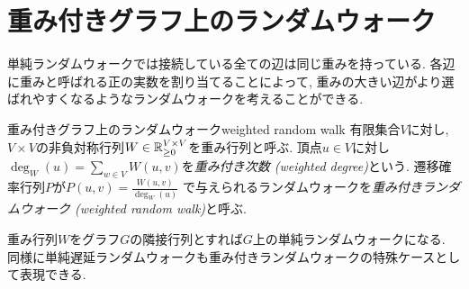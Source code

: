 \section{重み付きグラフ上のランダムウォーク}
単純ランダムウォークでは接続している全ての辺は同じ重みを持っている.
各辺に重みと呼ばれる正の実数を割り当てることによって,
重みの大きい辺がより選ばれやすくなるようなランダムウォークを考えることができる.
%
\begin{definition}{重み付きグラフ上のランダムウォーク}{weighted random walk}
  有限集合$V$に対し, $V\times V$の非負対称行列$W\in \mathbb{R}_{\ge 0}^{V\times V}$を重み行列と呼ぶ.
  頂点$u \in V$に対し$\deg_W(u) = \sum_{w \in V} W(u,v)$を\emph{重み付き次数 (weighted degree)}という.
  遷移確率行列$P$が$P(u,v) = \frac{W(u,v)}{\deg_W(u)}$
  で与えられるランダムウォークを\emph{重み付きランダムウォーク (weighted random walk)}と呼ぶ.
\end{definition}
重み行列$W$をグラフ$G$の隣接行列とすれば$G$上の単純ランダムウォークになる.
同様に単純遅延ランダムウォークも重み付きランダムウォークの特殊ケースとして表現できる.

\begin{comment}
\section{混交時間解析の実例}
講義とは直接な関係はないが,
最後にランダムウォークの混交性解析の応用例をいくつか簡単に説明する.
より深く知りたい読者はLevinとPeresによるこの分野の標準的な教科書\cite{LP17}を参照されたい.

\subsection{到達時間, 全訪問時間の解析}
\subsection{マルコフ連鎖モンテカルロ法}
\subsection{イジングモデル}
\end{comment}